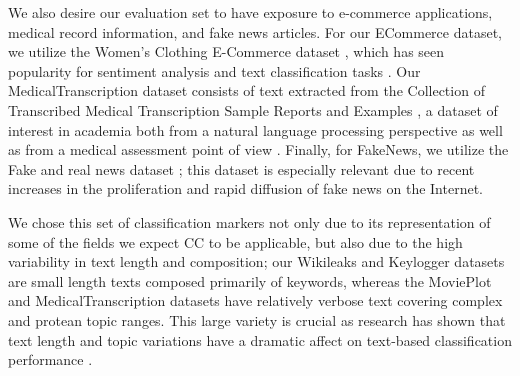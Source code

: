 \documentclass[11pt]{article}
\begin{document}
We also desire our evaluation set to have exposure to e-commerce applications, medical record information, and fake news articles. For our ECommerce dataset, we utilize the Women’s Clothing E-Commerce dataset \cite{agarap2018statistical}, which has seen popularity for sentiment analysis and text classification tasks \cite{sun2019sentiment, lin2020sentiment, koustalocal, cascaro2019aggregating}. Our MedicalTranscription dataset consists of text extracted from the Collection of Transcribed Medical Transcription Sample Reports and Examples \cite{medtransdataset}, a dataset of interest in academia both from a natural language processing perspective as well as from a medical assessment point of view \cite{beattie1994separation, moramarco2021towards, zuccon2014identification}. Finally, for FakeNews, we utilize the Fake and real news dataset \cite{ahmed2018detecting, ahmed2017detection}; this dataset is especially relevant due to recent increases in the proliferation and rapid diffusion of fake news on the Internet.

We chose this set of classification markers not only due to its representation of some of the fields we expect CC to be applicable, but also due to the high variability in text length and composition; our Wikileaks and Keylogger datasets are small length texts composed primarily of keywords, whereas the MoviePlot and MedicalTranscription datasets have relatively verbose text covering complex and protean topic ranges. This large variety is crucial as research has shown that text length and topic variations have a dramatic affect on text-based classification performance \cite{wang2012baselines}.
\end{document}
